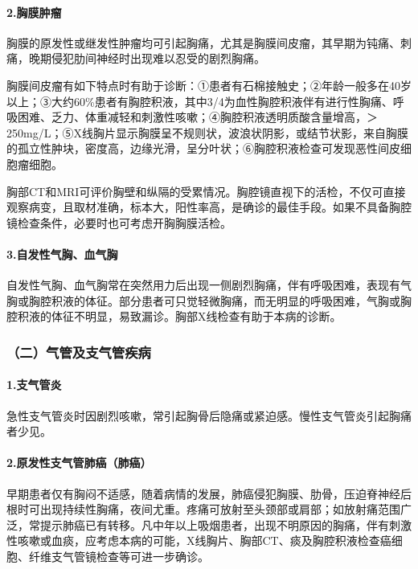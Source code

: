 \paragraph{2.胸膜肿瘤}

胸膜的原发性或继发性肿瘤均可引起胸痛，尤其是胸膜间皮瘤，其早期为钝痛、刺痛，晚期侵犯肋间神经时出现难以忍受的剧烈胸痛。

胸膜间皮瘤有如下特点时有助于诊断：①患者有石棉接触史；②年龄一般多在40岁以上；③大约60\%患者有胸腔积液，其中3/4为血性胸腔积液伴有进行性胸痛、呼吸困难、乏力、体重减轻和刺激性咳嗽；④胸腔积液透明质酸含量增高，＞250mg/L；⑤X线胸片显示胸膜呈不规则状，波浪状阴影，或结节状影，来自胸膜的孤立性肿块，密度高，边缘光滑，呈分叶状；⑥胸腔积液检查可发现恶性间皮细胞瘤细胞。

胸部CT和MRI可评价胸壁和纵隔的受累情况。胸腔镜直视下的活检，不仅可直接观察病变，且取材准确，标本大，阳性率高，是确诊的最佳手段。如果不具备胸腔镜检查条件，必要时也可考虑开胸胸膜活检。

\paragraph{3.自发性气胸、血气胸}

自发性气胸、血气胸常在突然用力后出现一侧剧烈胸痛，伴有呼吸困难，表现有气胸或胸腔积液的体征。部分患者可只觉轻微胸痛，而无明显的呼吸困难，气胸或胸腔积液的体征不明显，易致漏诊。胸部X线检查有助于本病的诊断。

\subsubsection{（二）气管及支气管疾病}

\paragraph{1.支气管炎}

急性支气管炎时因剧烈咳嗽，常引起胸骨后隐痛或紧迫感。慢性支气管炎引起胸痛者少见。

\paragraph{2.原发性支气管肺癌（肺癌）}

早期患者仅有胸闷不适感，随着病情的发展，肺癌侵犯胸膜、肋骨，压迫脊神经后根时可出现持续性胸痛，夜间尤重。疼痛可放射至头颈部或肩部；如放射痛范围广泛，常提示肺癌已有转移。凡中年以上吸烟患者，出现不明原因的胸痛，伴有刺激性咳嗽或血痰，应考虑本病的可能，X线胸片、胸部CT、痰及胸腔积液检查癌细胞、纤维支气管镜检查等可进一步确诊。


